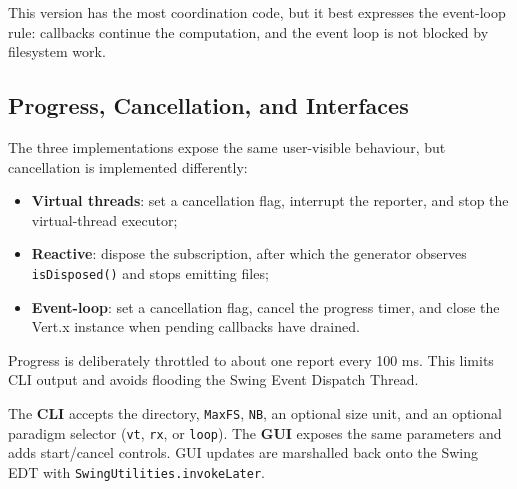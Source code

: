 This version has the most coordination code, but it best expresses the
event-loop rule: callbacks continue the computation, and the event loop is not
blocked by filesystem work.

\subsection{Progress, Cancellation, and Interfaces}

The three implementations expose the same user-visible behaviour, but
cancellation is implemented differently:

\begin{itemize}
  \item \textbf{Virtual threads}: set a cancellation flag, interrupt the
  reporter, and
  stop the virtual-thread executor;
  \item \textbf{Reactive}: dispose the subscription, after which the generator
  observes
  \texttt{isDisposed()} and stops emitting files;
  \item \textbf{Event-loop}: set a cancellation flag, cancel the progress
  timer, and close
  the Vert.x instance when pending callbacks have drained.
\end{itemize}

Progress is deliberately throttled to about one report every 100 ms. This
limits CLI output and avoids flooding the Swing Event Dispatch Thread.

The \textbf{CLI} accepts the directory, \texttt{MaxFS}, \texttt{NB}, an
optional size unit, and an optional paradigm selector
(\texttt{vt}, \texttt{rx}, or \texttt{loop}). The \textbf{GUI} exposes the same
parameters and adds start/cancel controls. GUI updates are marshalled back onto
the Swing EDT with \texttt{SwingUtilities.invokeLater}.
